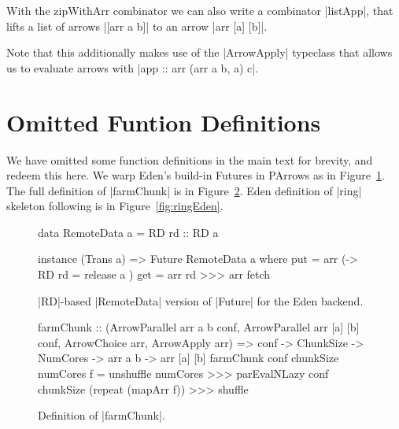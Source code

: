 With the zipWithArr combinator we can also write a combinator |listApp|, that lifts a list of arrows |[arr a b]| to an arrow |arr [a] [b]|.
Note that  this additionally makes use of the |ArrowApply| typeclass that allows us to evaluate arrows with |app :: arr (arr a b, a) c|.


\section{Omitted Funtion Definitions}

We have omitted some function definitions in the main text for
brevity, and redeem this here.
%
We warp Eden's build-in Futures in PArrows as in
Figure~\ref{fig:RDFuture}.
The full definition of |farmChunk| is in Figure~\ref{fig:farmChunk}.
Eden definition of |ring| skeleton following \citep{Loogen2012} is in Figure~\ref{fig:ringEden}.


\begin{figure}[h]
\begin{code}
data RemoteData a = RD { rd :: RD a }

instance (Trans a) => Future RemoteData a where
    put = arr (\a -> RD { rd = release a })
    get = arr rd >>> arr fetch
\end{code}
\caption{|RD|-based |RemoteData| version of |Future| for the Eden backend.}
\label{fig:RDFuture}
\end{figure}


\begin{figure}[h]
\begin{code}
farmChunk :: (ArrowParallel arr a b conf, ArrowParallel arr [a] [b] conf, 
             ArrowChoice arr, ArrowApply arr) =>
	conf -> ChunkSize -> NumCores -> arr a b -> arr [a] [b]
farmChunk conf chunkSize numCores f =
	unshuffle numCores >>>
	parEvalNLazy conf chunkSize (repeat (mapArr f)) >>>
	shuffle
\end{code}
\caption{Definition of |farmChunk|.}
\label{fig:farmChunk}
\end{figure}


